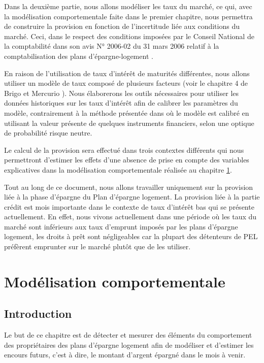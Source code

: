 \documentclass[12pt, a4paper]{book}
\begin{document}
Dans la deuxième partie, nous allons modéliser les taux du marché, ce qui, avec la modélisation comportementale faite dans le premier chapitre, nous permettra de construire la provision en fonction de l'incertitude liée aux conditions du marché. Ceci, dans le respect des conditions imposées par le Conseil National de la comptabilité dans son avis N° 2006-02 du 31 mars 2006 relatif à la comptabilisation des plans d'épargne-logement \cite{CNC1}.

En raison de l'utilisation de taux d'intérêt de maturités différentes, nous allons utiliser un modèle de taux composé de plusieurs facteurs (voir le chapitre 4 de Brigo et Mercurio \cite{BM}). Nous élaborerons les outils nécessaires pour utiliser les données historiques sur les taux d'intérêt afin de calibrer les paramètres du modèle, contrairement à la méthode présentée dans \cite{BM} où le modèle est calibré en utilisant la valeur présente de quelques instruments financiers, selon une optique de probabilité risque neutre.

Le calcul de la provision sera effectué dans trois contextes différents qui nous permettront d'estimer les effets d'une absence de prise en compte des variables explicatives dans la modélisation comportementale réalisée au chapitre \ref{chap1}.

Tout au long de ce document, nous allons travailler uniquement sur la provision liée à la phase d'épargne du Plan d'épargne logement. La provision liée à la partie crédit est mois importante dans le contexte de taux d'intérêt bas qui se présente actuellement. En effet, nous vivons actuellement dans une période où les taux du marché sont inférieurs aux taux d'emprunt imposés par les plans d'épargne logement, les droits à prêt sont négligeables car la plupart des détenteurs de PEL préfèrent emprunter sur le marché plutôt que de les utiliser.

\chapter{Modélisation comportementale}
\label{chap1}
\section{Introduction}

Le but de ce chapitre est de détecter et mesurer des éléments du comportement des propriétaires des plans d'épargne logement afin de modéliser et d'estimer les encours futurs, c'est à dire, le montant d'argent épargné dans le mois à venir. 
\end{document}
